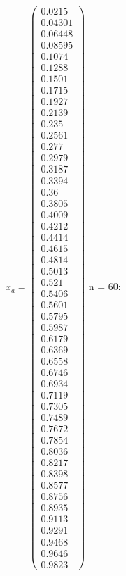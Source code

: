 \documentclass{udpreport}
\begin{document}
\begin{enumerate}
\begin {enumerate}
\begin{enumerate}
\begin{itemize}
					$x_{a} = \left(\begin{array}{c} 0.0215\\ 0.04301\\ 0.06448\\ 0.08595\\ 0.1074\\ 0.1288\\ 0.1501\\ 0.1715\\ 0.1927\\ 0.2139\\ 0.235\\ 0.2561\\ 0.277\\ 0.2979\\ 0.3187\\ 0.3394\\ 0.36\\ 0.3805\\ 0.4009\\ 0.4212\\ 0.4414\\ 0.4615\\ 0.4814\\ 0.5013\\ 0.521\\ 0.5406\\ 0.5601\\ 0.5795\\ 0.5987\\ 0.6179\\ 0.6369\\ 0.6558\\ 0.6746\\ 0.6934\\ 0.7119\\ 0.7305\\ 0.7489\\ 0.7672\\ 0.7854\\ 0.8036\\ 0.8217\\ 0.8398\\ 0.8577\\ 0.8756\\ 0.8935\\ 0.9113\\ 0.9291\\ 0.9468\\ 0.9646\\ 0.9823 \end{array}\right)$					
					 n = 60:	

\end{itemize}
\end{enumerate}
\end{enumerate}
\end{enumerate}
\end{document}
